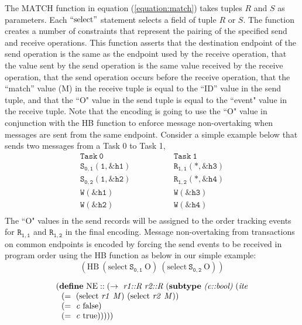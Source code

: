 The $\mathrm{MATCH}$ function in equation (\ref{equation:match}) takes tuples $R$ and $S$ as parameters. Each $``\mathrm{select}"$ statement selects a field of tuple $R$ or $S$. The function creates a number of constraints that represent the pairing
of the specified send and receive operations. This function asserts that the
destination endpoint of the send operation is the same as the endpoint used by
the receive operation, that the value sent by the send operation is the same
value received by the receive operation, that the send operation occurs before
the receive operation, that the ``match'' value (M) in the receive tuple is
equal to the ``ID'' value in the send tuple, and that the ``O" value in the send tuple is equal to the ``event" value in the receive tuple. Note that the encoding is going to use the ``O"  value in conjunction with the HB function to enforce message non-overtaking when messages are sent from the same endpoint. Consider a simple example below that sends two messages from a Task 0 to Task 1,
\[
\begin{array}{l|l}
\;\;\;\;\;\;\;\;\mathtt{Task\ 0}\;\;\;\;\;\;\;\; & \;\;\;\;\;\;\;\; \mathtt{Task\ 1}\;\;\;\;\;\;\;\; \\
\hline
\;\;\;\;\;\;\;\;\mathtt{S_{0,1}(1,\&h1)}\;\;\;\;\;\;\;\; & \;\;\;\;\;\;\;\; \mathtt{R_{1,1}(*,\&h3)}\;\;\;\;\;\;\;\; \\
\;\;\;\;\;\;\;\;\mathtt{S_{0,2}(1,\&h2)}\;\;\;\;\;\;\;\; & \;\;\;\;\;\;\;\; \mathtt{R_{1,2}(*,\&h4)}\;\;\;\;\;\;\;\; \\
\;\;\;\;\;\;\;\;\mathtt{W(\&h1)}\;\;\;\;\;\;\;\; & \;\;\;\;\;\;\;\; \mathtt{W(\&h3)}\;\;\;\;\;\;\;\; \\
\;\;\;\;\;\;\;\;\mathtt{W(\&h2)}\;\;\;\;\;\;\;\; & \;\;\;\;\;\;\;\; \mathtt{W(\&h4)}\;\;\;\;\;\;\;\; \\
\end{array}
\]
The ``O" values in the send records will be assigned to the order tracking events for $\mathtt{R_{1,1}}$ and $\mathtt{R_{1,2}}$ in the final encoding. Message non-overtaking from transactions on common endpoints is encoded by forcing the send events to be received in program order using the HB function as below in our simple example:
\[(\mathrm{HB}\ (\mathrm{select}\ \mathtt{S_{0,1}}\ \mathrm{O})\ (\mathrm{select}\ \mathtt{S_{0,2}}\ \mathrm{O}))\]


\begin{equation}
\begin{array}{l}
(\cfgt{define}\ \mathrm{NE}::(\rightarrow\ \cfgnt{r1::R}\ \cfgnt{r2::R}\ (\cfgt{subtype}\ \cfgnt{(c::bool)}\ (\cfgnt{ite} \\
\ \ (=\ (\mathrm{select}\ \mathit{r1}\ \mathit{M})\ (\mathrm{select}\ \mathit{r2}\ \mathit{M})) \\
\ \ (=\ \mathit{c}\ \mathrm{false}) \\
\ \ (=\ \mathit{c}\ \mathrm{true})))))
\end{array}
\label{equation:ne}
\end{equation}

